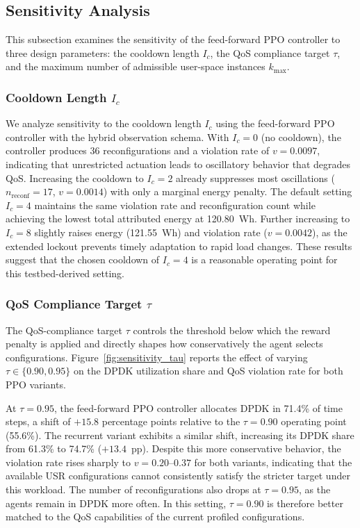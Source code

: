 \documentclass[a4paper,fleqn]{cas-sc}
\begin{document}
\subsection{Sensitivity Analysis}
\label{subsec:sensitivity}

This subsection examines the sensitivity of the feed-forward PPO controller to three design parameters: the cooldown length $I_c$, the QoS compliance target $\tau$, and the maximum number of admissible user-space instances $k_{\max}$.

\subsubsection{Cooldown Length $I_c$}
\label{subsubsec:sensitivity_ic}

We analyze sensitivity to the cooldown length $I_c$ using the feed-forward PPO controller with the hybrid observation schema. With $I_c=0$ (no cooldown), the controller produces 36 reconfigurations and a violation rate of $v=0.0097$, indicating that unrestricted actuation leads to oscillatory behavior that degrades QoS. Increasing the cooldown to $I_c=2$ already suppresses most oscillations ($n_{\mathrm{reconf}}=17$, $v=0.0014$) with only a marginal energy penalty. The default setting $I_c=4$ maintains the same violation rate and reconfiguration count while achieving the lowest total attributed energy at 120.80~Wh. Further increasing to $I_c=8$ slightly raises energy (121.55~Wh) and violation rate ($v=0.0042$), as the extended lockout prevents timely adaptation to rapid load changes. These results suggest that the chosen cooldown of $I_c=4$ is a reasonable operating point for this testbed-derived setting.

\subsubsection{QoS Compliance Target $\tau$}
\label{subsubsec:sensitivity_tau}

The QoS-compliance target $\tau$ controls the threshold below which the reward penalty is applied and directly shapes how conservatively the agent selects configurations. Figure~\ref{fig:sensitivity_tau} reports the effect of varying $\tau \in \{0.90, 0.95\}$ on the DPDK utilization share and QoS violation rate for both PPO variants.

At $\tau=0.95$, the feed-forward PPO controller allocates DPDK in 71.4\% of time steps, a shift of $+15.8$ percentage points relative to the $\tau=0.90$ operating point (55.6\%). The recurrent variant exhibits a similar shift, increasing its DPDK share from 61.3\% to 74.7\% ($+13.4$~pp). Despite this more conservative behavior, the violation rate rises sharply to $v=0.20$--$0.37$ for both variants, indicating that the available USR configurations cannot consistently satisfy the stricter target under this workload. The number of reconfigurations also drops at $\tau=0.95$, as the agents remain in DPDK more often. In this setting, $\tau=0.90$ is therefore better matched to the QoS capabilities of the current profiled configurations.
\end{document}
